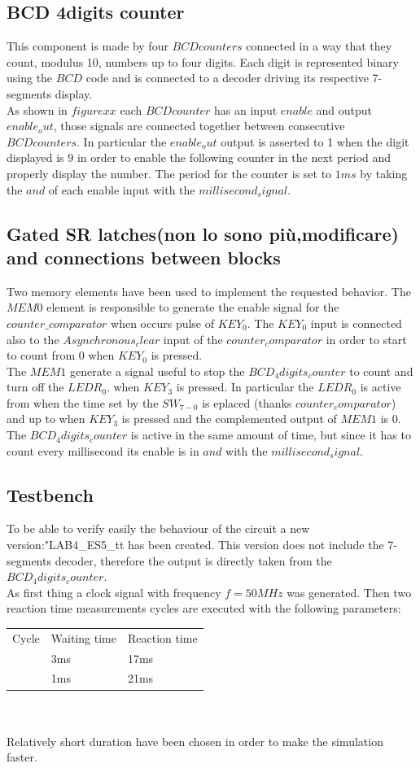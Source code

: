 \documentclass[12pt]{article}
\begin{document}
\subsection{BCD 4digits counter}
This component is made by four $BCDcounters$ connected in a way that they count, modulus 10, numbers up to four digits. Each digit is represented binary using the $BCD$ code and is connected to a decoder driving its respective 7-segments display. \\
As shown in $figure xx$ each $BCDcounter$ has an input $enable$ and output $enable_out$, those signals are connected together between consecutive $BCDcounters$. In particular the $enable_out$ output is asserted to 1 when the digit displayed is $9$ in order to enable the following counter in the next period and properly display the number. The period for the counter is set to $1ms$ by taking the $and$ of each enable input with the $millisecond_signal$.
\subsection{Gated SR latches(non lo sono più,modificare) and connections between blocks}
Two memory elements have been used to implement the requested behavior. 
The $MEM0$ element is responsible to generate the enable signal for the $counter\_comparator$ when occurs pulse of $KEY_0$. The $KEY_0$ input is connected also to the $Asynchronous_clear$ input of the $counter_comparator$ in order to start to count from $0$ when $KEY_0$ is pressed.
\\The $MEM1$ generate a signal useful to stop the $BCD_4digits_counter$ to count and turn off the $LEDR_0$. when $KEY_3$ is pressed. In particular the $LEDR_0$ is active from when the time set by the $SW_{7-0}$ is eplaced (thanks $counter_comparator$) and up to when $KEY_3$ is pressed and the complemented output of $MEM1$ is $0$. The $BCD_4digits_counter$ is active in the same amount of time, but since it has to count every millisecond its enable is in $and$ with the $millisecond_signal$.
\subsection{Testbench}
To be able to verify easily the behaviour of the circuit a new version:"LAB4\_ES5\_tt has been created. This version does not include the 7-segments decoder, therefore the output is directly taken from the $BCD_4digits_counter$. \\
As first thing a clock signal with frequency $f=50MHz$ was generated. 
Then two reaction time measurements cycles are executed with the following parameters:

	\begin{tabular}{lll}
		Cycle & Waiting time & Reaction time \\
		& 3ms          & 17ms          \\
		& 1ms          & 21ms         
	\end{tabular}
\\
\\
Relatively short duration have been chosen in order to make the simulation faster.
\end{document}
